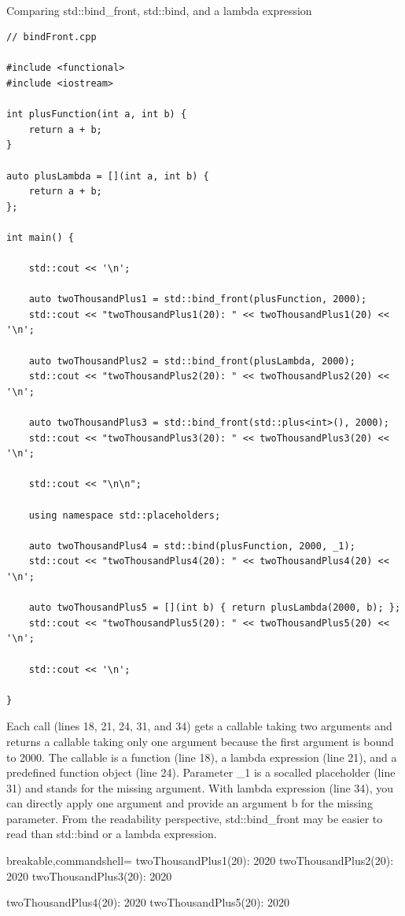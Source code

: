 \hspace*{\fill} \\ %
\noindent
Comparing std::bind\_front, std::bind, and a lambda expression
\begin{lstlisting}[style=styleCXX]
// bindFront.cpp

#include <functional>
#include <iostream>

int plusFunction(int a, int b) {
	return a + b;
}

auto plusLambda = [](int a, int b) {
	return a + b;
};

int main() {

	std::cout << '\n';
	
	auto twoThousandPlus1 = std::bind_front(plusFunction, 2000);
	std::cout << "twoThousandPlus1(20): " << twoThousandPlus1(20) << '\n';
	
	auto twoThousandPlus2 = std::bind_front(plusLambda, 2000);
	std::cout << "twoThousandPlus2(20): " << twoThousandPlus2(20) << '\n';
	
	auto twoThousandPlus3 = std::bind_front(std::plus<int>(), 2000);
	std::cout << "twoThousandPlus3(20): " << twoThousandPlus3(20) << '\n';
	
	std::cout << "\n\n";
	
	using namespace std::placeholders;
	
	auto twoThousandPlus4 = std::bind(plusFunction, 2000, _1);
	std::cout << "twoThousandPlus4(20): " << twoThousandPlus4(20) << '\n';
	
	auto twoThousandPlus5 = [](int b) { return plusLambda(2000, b); };
	std::cout << "twoThousandPlus5(20): " << twoThousandPlus5(20) << '\n';
	
	std::cout << '\n';

}
\end{lstlisting}

Each call (lines 18, 21, 24, 31, and 34) gets a callable taking two arguments and returns a callable taking only one argument because the first argument is bound to 2000. The callable is a function (line 18), a lambda expression (line 21), and a predefined function object (line 24). Parameter \_1 is a socalled placeholder (line 31) and stands for the missing argument. With lambda expression (line 34), you can directly apply one argument and provide an argument b for the missing parameter. From the readability perspective, std::bind\_front may be easier to read than std::bind or a lambda expression.

\begin{tcblisting}{breakable,commandshell={}}
twoThousandPlus1(20): 2020
twoThousandPlus2(20): 2020
twoThousandPlus3(20): 2020

twoThousandPlus4(20): 2020
twoThousandPlus5(20): 2020
\end{tcblisting}

